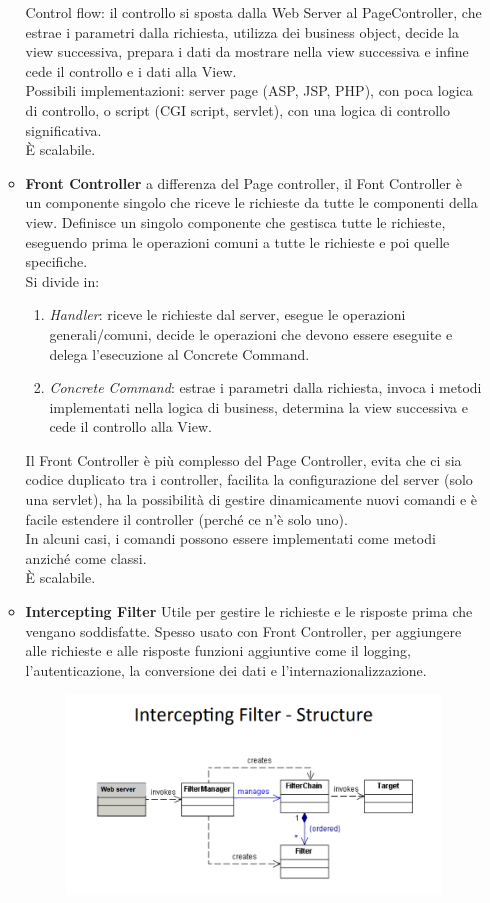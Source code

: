 \begin{itemize}
\begin{itemize}
        Control flow: il controllo si sposta dalla Web Server al PageController, che estrae i parametri dalla richiesta, utilizza dei business object, decide la view successiva, prepara i dati da mostrare nella view successiva e infine cede il controllo e i dati alla View.\\
        Possibili implementazioni: server page (ASP, JSP, PHP), con poca logica di controllo, o script (CGI script, servlet), con una logica di controllo significativa.\\
        È scalabile.
        \item \textbf{Front Controller} a differenza del Page controller, il Font Controller è un componente singolo che riceve le richieste da tutte le componenti della view.
        Definisce un singolo componente che gestisca tutte le richieste, eseguendo prima le operazioni comuni a tutte le richieste e poi quelle specifiche.\\
        Si divide in: 
        \begin{enumerate}
            \item \textit{Handler}: riceve le richieste dal server, esegue le operazioni generali/comuni, decide le operazioni che devono essere eseguite e delega l’esecuzione al Concrete Command.
            \item \textit{Concrete Command}: estrae i parametri dalla richiesta, invoca i metodi implementati nella logica di business, determina la view successiva e cede il controllo alla View.
        \end{enumerate}
        Il Front Controller è più complesso del Page Controller, evita che ci sia codice duplicato tra i controller, facilita la configurazione del server (solo una servlet), ha la possibilità di gestire dinamicamente nuovi comandi e è facile estendere il controller (perché ce n’è solo uno).\\
        In alcuni casi, i comandi possono essere implementati come metodi anziché come classi.\\
        È scalabile.
        \item \textbf{Intercepting Filter} 
        Utile per gestire le richieste e le risposte prima che vengano soddisfatte.
        Spesso usato con Front Controller, per aggiungere alle richieste e alle risposte funzioni aggiuntive come il logging, l’autenticazione, la conversione dei dati e l’internazionalizzazione.
        \begin{figure}[H]
            \centering
            \includegraphics[scale=0.6]{Imm/if-struttura.PNG}

\end{figure}
\end{itemize}
\end{itemize}
